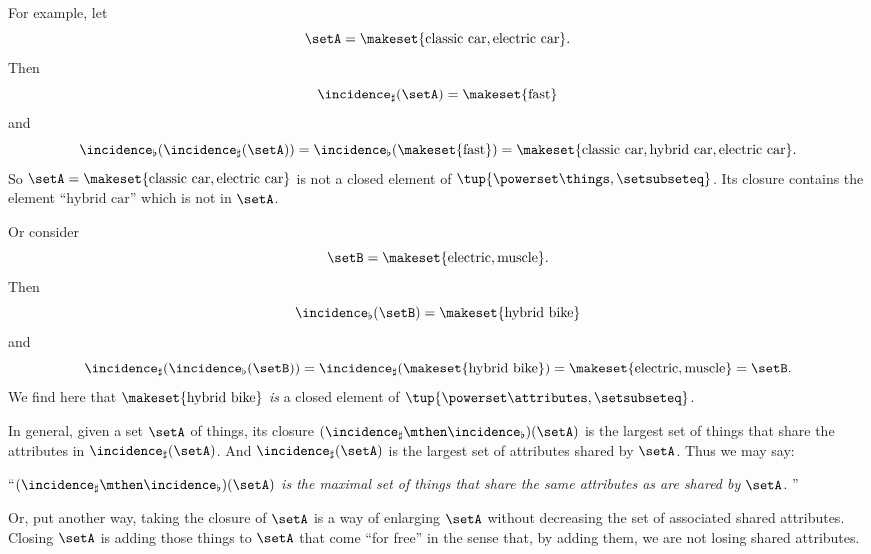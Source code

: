 For example, let
\begin{equation}\label{eq:cfa-closure-example-1}
    \setA = \makeset{\text{classic car}, \text{electric car}}.
\end{equation}
Then
\begin{equation}\label{eq:cfa-closure-example-2}
    \incidence_\sharp(\setA) = \makeset{\text{fast}}
\end{equation}
and
\begin{equation}\label{eq:cfa-closure-example-3}
    \incidence_\flat(\incidence_\sharp(\setA)) = \incidence_\flat(\makeset{\text{fast}}) = \makeset{\text{classic car}, \text{hybrid car}, \text{electric car}}.
\end{equation}
So $\setA = \makeset{\text{classic car}, \text{electric car}}$ is not a closed element of $\tup{\powerset \things, \setsubseteq}$.
Its closure contains the element ``$\text{hybrid car}$'' which is not in $\setA$.

Or consider
\begin{equation}\label{eq:cfa-closure-example-4}
    \setB = \makeset{\text{electric}, \text{muscle}}.
\end{equation}
Then
\begin{equation}\label{eq:cfa-closure-example-5}
    \incidence_\flat(\setB) = \makeset{\text{hybrid bike}}
\end{equation}
and
\begin{equation}\label{eq:cfa-closure-example-6}
    \incidence_\sharp(\incidence_\flat(\setB)) = \incidence_\sharp(\makeset{\text{hybrid bike}}) = \makeset{\text{electric}, \text{muscle}} = \setB.
\end{equation}
We find here that $\makeset{\text{hybrid bike}}$ \emph{is} a closed element of $\tup{\powerset \attributes, \setsubseteq}$.

In general, given a set $\setA$ of things, its closure $(\incidence_\sharp \mthen \incidence_\flat)(\setA)$ is the largest set of things that share the attributes in $\incidence_\sharp(\setA)$.
And $\incidence_\sharp(\setA)$ is the largest set of attributes shared by $\setA$.
Thus we may say:

``\emph{$(\incidence_\sharp \mthen \incidence_\flat)(\setA)$ is the maximal set of things that share the same attributes as are shared by $\setA$}.
''

Or, put another way, taking the closure of $\setA$ is a way of enlarging $\setA$ without decreasing the set of associated shared attributes.
Closing $\setA$ is adding those things to $\setA$ that come ``for free'' in the sense that, by adding them, we are not losing shared attributes.

